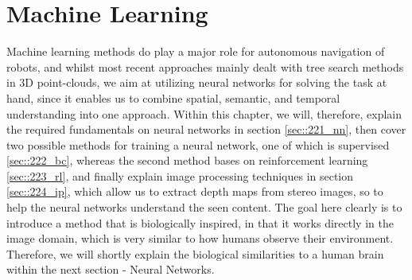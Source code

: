 \FloatBarrier
\section{Machine Learning}  
\label{sec::22_ml}
Machine learning methods do play a major role for autonomous navigation of robots, and whilst most recent approaches mainly dealt with tree search methods in 3D point-clouds, we aim at utilizing neural networks for solving the task at hand, since it enables us to combine spatial, semantic, and temporal understanding into one approach. Within this chapter, we will, therefore, explain the required fundamentals on neural networks in section \ref{sec::221_nn}, then cover two possible methods for training a neural network, one of which is supervised \ref{sec::222_bc}, whereas the second method bases on reinforcement learning \ref{sec::223_rl}, and finally explain image processing techniques in section \ref{sec::224_ip}, which allow us to extract depth maps from stereo images, so to help the neural networks understand the seen content. The goal here clearly is to introduce a method that is biologically inspired, in that it works directly in the image domain, which is very similar to how humans observe their environment. Therefore, we will shortly explain the biological similarities to a human brain within the next section - Neural Networks.